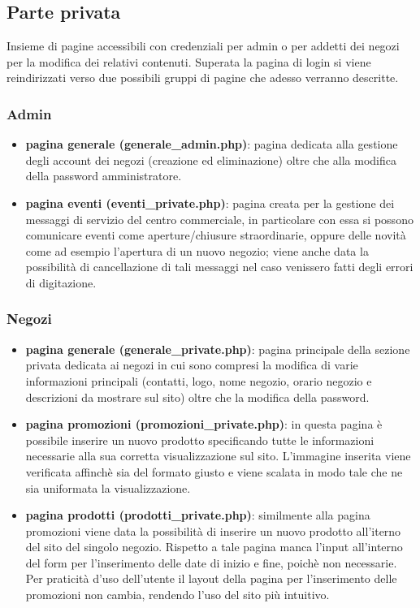 \documentclass[a4paper,12pt]{article}
\begin{document}
\subsection{Parte privata}
Insieme di pagine accessibili con credenziali per admin o per addetti dei negozi per la modifica dei relativi contenuti. Superata la pagina di login si viene reindirizzati verso due possibili gruppi di pagine che adesso verranno descritte.
\subsubsection{Admin}
\begin{itemize}
	\item \textbf{pagina generale (generale\_admin.php)}: pagina dedicata alla gestione degli account dei negozi (creazione ed eliminazione) oltre che alla modifica della password amministratore.
	\item \textbf{pagina eventi (eventi\_private.php)}: pagina creata per la gestione dei messaggi di servizio del centro commerciale, in particolare con essa si possono comunicare eventi come aperture/chiusure straordinarie, oppure delle novità come ad esempio l'apertura di un nuovo negozio; viene anche data la possibilità di cancellazione di tali messaggi nel caso venissero fatti degli errori di digitazione.
\end{itemize}
\subsubsection{Negozi}
\begin{itemize}
	\item \textbf{pagina generale (generale\_private.php)}: pagina principale della sezione privata dedicata ai negozi in cui sono compresi la modifica di varie informazioni principali (contatti, logo, nome negozio, orario negozio e descrizioni da mostrare sul sito) oltre che la modifica della password.
	\item \textbf{pagina promozioni (promozioni\_private.php)}: in questa pagina è possibile inserire un nuovo prodotto specificando tutte le informazioni necessarie alla sua corretta visualizzazione sul sito. L'immagine inserita viene verificata affinchè sia del formato giusto e viene scalata in modo tale che ne sia uniformata la visualizzazione.
	\item \textbf{pagina prodotti (prodotti\_private.php)}: similmente alla pagina promozioni viene data la possibilità di inserire un nuovo prodotto all'iterno del sito del singolo negozio. Rispetto a tale pagina manca l'input all'interno del form per l'inserimento delle date di inizio e fine, poichè non necessarie. Per praticità d'uso dell'utente il layout della pagina per l'inserimento delle promozioni non cambia, rendendo l'uso del sito più intuitivo.
	
\end{itemize}
\newpage
\end{document}
